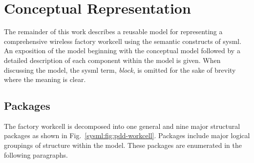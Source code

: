 %

\section{Conceptual Representation} \label{sysml:sec:conceptual}
The remainder of this work describes a reusable model for representing a comprehensive wireless factory workcell using the semantic constructs of \gls{sysml}.  An exposition of the model beginning with the conceptual model followed by a detailed description of each component within the model is given. When discussing the model, the \gls{sysml} term, \textit{block}, is omitted for the sake of brevity where the meaning is clear. 

\subsection{Packages}
The factory workcell is decomposed into one general and nine major structural packages as shown in Fig.~\ref{sysml:fig:pdd-workcell}.  Packages include major logical groupings of structure within the model.  These packages are enumerated in the following paragraphs.

